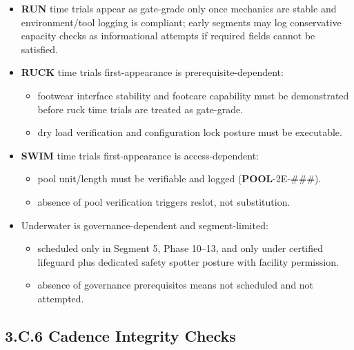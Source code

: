 \documentclass[10pt]{article}
\begin{document}
\begin{itemize}
\item \textbf{RUN} time trials appear as gate-grade only once mechanics are stable and environment/tool logging is compliant; early segments may log conservative capacity checks as informational attempts if required fields cannot be satisfied.
\item \textbf{RUCK} time trials first-appearance is prerequisite-dependent:
  \begin{itemize}
  \item footwear interface stability and footcare capability must be demonstrated before ruck time trials are treated as gate-grade.
  \item dry load verification and configuration lock posture must be executable.
  \end{itemize}
\item \textbf{SWIM} time trials first-appearance is access-dependent:
  \begin{itemize}
  \item pool unit/length must be verifiable and logged (\textbf{POOL}-2E-\#\#\#).
  \item absence of pool verification triggers reslot, not substitution.
  \end{itemize}
\item Underwater is governance-dependent and segment-limited:
  \begin{itemize}
  \item scheduled only in Segment 5, Phase 10–13, and only under certified lifeguard plus dedicated safety spotter posture with facility permission.
  \item absence of governance prerequisites means not scheduled and not attempted.
  \end{itemize}
\end{itemize}

\subsection*{3.C.6 Cadence Integrity Checks}
{}
\end{document}
